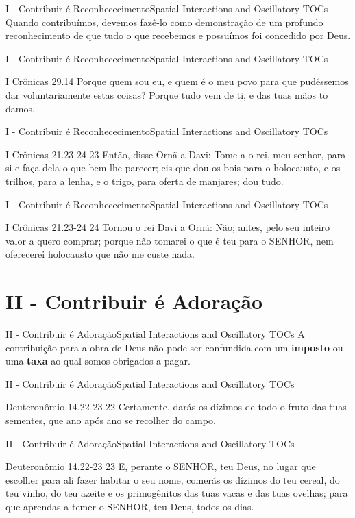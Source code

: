 \documentclass[14pt,aspectratio=169]{beamer}
\newcommand{\TT}{Spatial Interactions and Oscillatory TOCs}
\newcommand{\PI}{I - Contribuir é Reconhececimento}
\newcommand{\PII}{II - Contribuir é Adoração}
\begin{document}
\begin{frame}{\PI}{\TT}
 Quando contribuímos, devemos fazê-lo como demonstração de um profundo reconhecimento de que tudo o que recebemos e possuímos foi concedido por Deus.
\end{frame}

\begin{frame}{\PI}{\TT}
 \begin{block}{I Crônicas 29.14}
 Porque quem sou eu, e quem é o meu povo para que pudéssemos dar voluntariamente estas coisas? Porque tudo vem de ti, e das tuas mãos to damos.
 \end{block}
\end{frame}

\begin{frame}{\PI}{\TT}
 \begin{block}{I Crônicas 21.23-24}\pause
 \Large
23 Então, disse Ornã a Davi: Tome-a o rei, meu senhor, para si e faça dela o que bem lhe parecer; eis que dou os bois para o holocausto, e os trilhos, para a lenha, e o trigo, para oferta de manjares; dou tudo.
 \end{block}
\end{frame}

\begin{frame}{\PI}{\TT}
 \begin{block}{I Crônicas 21.23-24}
24 Tornou o rei Davi a Ornã: Não; antes, pelo seu inteiro valor a quero comprar; porque não tomarei o que é teu para o SENHOR, nem oferecerei holocausto que não me custe nada.
 \end{block}
\end{frame}

\section{\PII}
 \begin{frame}{\PII}{\TT}\pause
 A contribuição para a obra de Deus não pode ser confundida com um \textbf{imposto} ou uma \textbf{taxa} ao qual somos obrigados a pagar.
 \end{frame}

\begin{frame}{\PII}{\TT}
 \begin{block}{Deuteronômio 14.22-23}
 22 Certamente, darás os dízimos de todo o fruto das tuas sementes, que ano após ano se recolher do campo.
 \end{block}
\end{frame}

\begin{frame}{\PII}{\TT}
 \begin{block}{Deuteronômio 14.22-23}
\Large 
23 E, perante o SENHOR, teu Deus, no lugar que escolher para ali fazer habitar o seu nome, comerás os dízimos do teu cereal, do teu vinho, do teu azeite e os primogênitos das tuas vacas e das tuas ovelhas; para que aprendas a temer o SENHOR, teu Deus, todos os dias.
 \end{block}
\end{frame}
\end{document}
